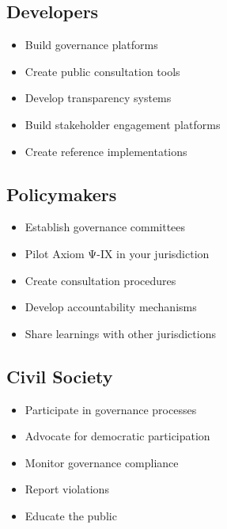 \subsection{Developers}

\begin{itemize}
    \item Build governance platforms
    \item Create public consultation tools
    \item Develop transparency systems
    \item Build stakeholder engagement platforms
    \item Create reference implementations
\end{itemize}

\subsection{Policymakers}

\begin{itemize}
    \item Establish governance committees
    \item Pilot Axiom Ψ-IX in your jurisdiction
    \item Create consultation procedures
    \item Develop accountability mechanisms
    \item Share learnings with other jurisdictions
\end{itemize}

\subsection{Civil Society}

\begin{itemize}
    \item Participate in governance processes
    \item Advocate for democratic participation
    \item Monitor governance compliance
    \item Report violations
    \item Educate the public
\end{itemize}

\cleardoublepage
